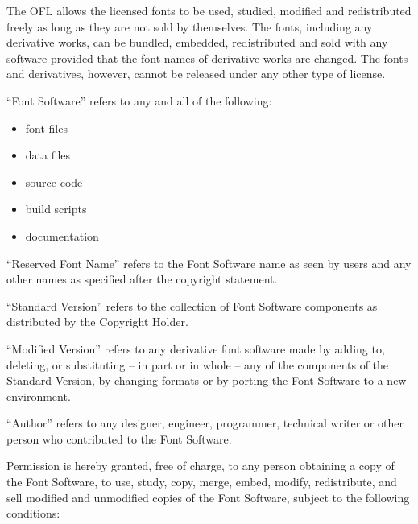 \documentclass{fontdokuold}
\begin{document}
The OFL allows the licensed fonts to be used, studied, modified and
redistributed freely as long as they are not sold by themselves. The
fonts, including any derivative works, can be bundled, embedded,
redistributed and sold with any software provided that the font
names of derivative works are changed. The fonts and derivatives,
however, cannot be released under any other type of license.


"`Font Software"' refers to any and all of the following:
\begin{itemize}
\item font files
\item data files
\item source code
\item build scripts
\item documentation
\end{itemize}

"`Reserved Font Name"' refers to the Font Software name as seen by
users and any other names as specified after the copyright statement.

"`Standard Version"' refers to the collection of Font Software
components as distributed by the Copyright Holder.

"`Modified Version"'  refers to any derivative font software made by
adding to, deleting, or substituting -- in part or in whole --
any of the components of the Standard Version, by changing formats
or by porting the Font Software to a new environment.

"`Author"' refers to any designer, engineer, programmer, technical
writer or other person who contributed to the Font Software.


Permission is hereby granted, free of charge, to any person obtaining
a copy of the Font Software, to use, study, copy, merge, embed, modify,
redistribute, and sell modified and unmodified copies of the Font
Software, subject to the following conditions:
\end{document}
